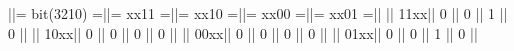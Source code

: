 \begin{textcode}
||= bit(3210) =||= xx11 =||= xx10 =||= xx00 =||= xx01 =||
||         11xx||     0  ||     0  ||     1  ||     0  ||
||         10xx||     0  ||     0  ||     0  ||     0  ||
||         00xx||     0  ||     0  ||     0  ||     0  ||
||         01xx||     0  ||     0  ||     1  ||     0  ||
\end{textcode}

